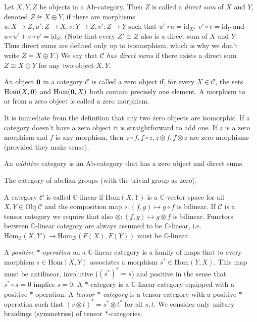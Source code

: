 \documentclass[11pt]{article}
\theoremstyle{definition}
\theoremstyle{definition}
\theoremstyle{remark}
\newcommand{\Obj}{\mathrm{Obj}}
\def\2#1{{\mathcal #1}}
\def\7#1{{\mathbb #1}}
\def\1#1{{\bf #1}}
\newcommand{\Hom}{\mathrm{Hom}}
\newcommand{\rarr}{\rightarrow}
\def\id{\mathrm{id}}
\begin{document}
\bdefin \label{def-dirsum}
Let $X,Y,Z$ be objects in a Ab-category. Then $Z$ is called a \emph{direct sum} of $X$ and $Y$,
denoted $Z\cong X\oplus Y$, if there are morphisms $u:X\rarr Z, u':Z\rarr X,v:Y\rarr Z, v':Z\rarr Y$
such that $u'\circ u=\id_X,\ v'\circ v=\id_Y$ and $u\circ u'+v\circ v'=\id_Z$. (Note that every
$Z'\cong Z$ also is a direct sum of $X$ and $Y$. Thus direct sums are defined only up to
isomorphism, which is why we don't write $Z=X\oplus Y$.) We say  that $\2C$ \emph{has direct sums}
if there exists a direct sum $Z\cong X\oplus Y$ for any two object $X,Y$.
\edefin

\bdefin
An object $\10$ in a category $\2C$ is called a zero object if, for every $X\in\2C$, the sets
$\Hom(X,\10)$ and $\Hom(\10,X)$ both contain precisely one element. A morphism to or from a zero
object is called a zero morphism. 
\edefin

It is immediate from the definition that any two zero objects are isomorphic. If a category doesn't
have a zero object it is straightforward to add one. If $z$ is a zero morphism and $f$ is any
morphism, then $z\circ f, f\circ z, z\otimes f, f\otimes z$ are zero morphisms (provided they make sense).


\bdefin {}  
An \emph{additive} category is an Ab-category that has a zero object and direct sums.
\edefin

\bexam The category of abelian groups (with the trivial group as zero).
\eexam

\bdefin \index{category!$\7C$-linear}
A category $\2C$ is called $\7C$-linear if $\Hom(X,Y)$ is a $\7C$-vector space for all
$X,Y\in\Obj\,\2C$ and the composition map $\circ: (f,g)\mapsto g\circ f$ is bilinear. If $\2C$ is a
tensor category we require that also $\otimes: (f,g)\mapsto g\otimes f$ is bilinear.
Functors between $\7C$-linear category are always assumed to be $\7C$-linear, i.e.\
$\Hom_\2C(X,Y)\rarr\Hom_\2D(F(X),F(Y))$ must be $\7C$-linear.
\edefin


\bdefin {}
A \emph{positive $*$-operation} on a $\7C$-linear category is a family of maps that to every
morphism $s\in\Hom(X,Y)$ associates a morphism $s^*\in\Hom(Y,X)$. This map must be antilinear,
involutive ($(s^*)^*=s$) and positive in the sense that $s^*\circ s=0$ implies $s=0$. A $*$-category
is a $\7C$-linear category equipped with a positive $*$-operation. A \emph{tensor $*$-category} is a tensor
category with a positive $*$-operation such that $(s\otimes t)^*=s^*\otimes t^*$ for all $s,t$.
We consider only unitary braidings (symmetries) of tensor $*$-categories.
\edefin
\end{document}
